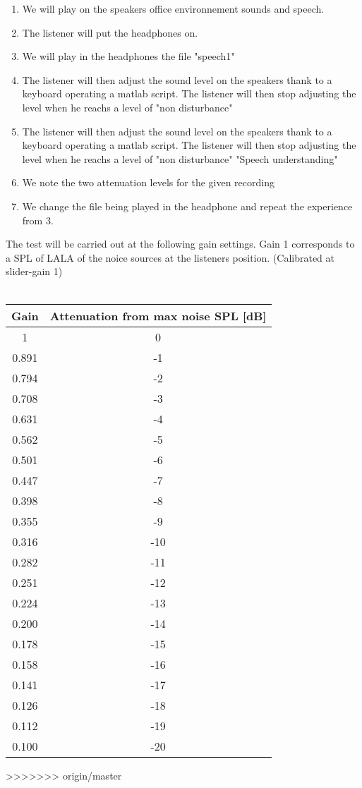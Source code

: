 \begin{enumerate}
\item We will play on the speakers office environnement sounds and speech. 
\item The listener will put the headphones on.
\item We will play in the headphones the file "speech1"
\item The listener will then adjust the sound level on the speakers thank to a keyboard operating a matlab script. The listener will then stop adjusting the level when he reachs a level of "non disturbance"
\item The listener will then adjust the sound level on the speakers thank to a keyboard operating a matlab script. The listener will then stop adjusting the level when he reachs a level of "non disturbance" "Speech understanding"
\item We note the two attenuation levels for the given recording
\item We change the file being played in the headphone and repeat the experience from 3.
\end{enumerate}


The test will be carried out at the following gain settings. Gain 1 corresponds to a SPL of LALA of the noice sources at the listeners position. (Calibrated at slider-gain 1) \\\\
\begin{tabular}{c | c} \toprule 
Gain & Attenuation from max noise SPL [dB]  \\ \toprule
1 		& 0   \\
0.891 	& -1  \\
0.794	& -2  \\
0.708	& -3  \\
0.631	& -4  \\
0.562	& -5  \\
0.501	& -6  \\
0.447	& -7  \\
0.398	& -8  \\
0.355	& -9  \\
0.316	& -10 \\
0.282 	& -11  \\
0.251	& -12  \\
0.224	& -13  \\
0.200	& -14  \\
0.178	& -15  \\
0.158	& -16  \\
0.141	& -17  \\
0.126	& -18  \\
0.112	& -19  \\
0.100	& -20 \\ \bottomrule

\end{tabular}
>>>>>>> origin/master

